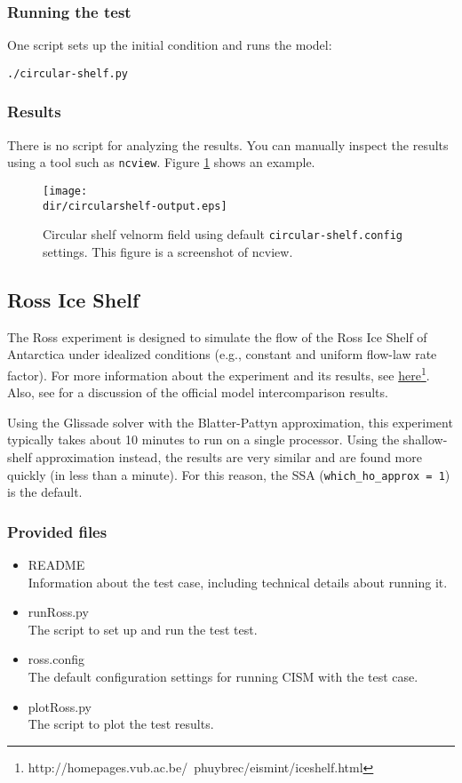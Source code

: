\subsubsection{Running the test}
One script sets up the initial condition and runs the model:

\texttt{./circular-shelf.py}

\subsubsection{Results}
There is no  script for analyzing the results.
You can manually inspect the results using a tool such as \texttt{ncview}.
Figure \ref{fig:circularshelf-results} shows an example.

\begin{figure}[H!]
	\centering
	\texttt{[image: \\dir/circularshelf-output.eps]}
	\caption{Circular shelf velnorm field using default \texttt{circular-shelf.config} settings. This figure is a screenshot of ncview.}
	\label{fig:circularshelf-results}
\end{figure}
\FloatBarrier

\subsection{Ross Ice Shelf}
The Ross experiment is designed to simulate the flow of the Ross Ice Shelf of Antarctica under idealized conditions (e.g., constant and uniform
flow-law rate factor). For more information about the experiment and its results, see 
\href{http://homepages.vub.ac.be/~phuybrec/eismint/iceshelf.html}{here}\footnote{http://homepages.vub.ac.be/~phuybrec/eismint/iceshelf.html}. 
Also, see \citet{MacAyeal:1996vn} for a discussion of the official model intercomparison results.

Using the Glissade solver with the Blatter-Pattyn approximation, this experiment typically 
takes about 10 minutes to run on a single processor.  Using the shallow-shelf approximation instead,
the results are very similar and are found more quickly (in less than a minute).
For this reason, the SSA (\texttt{which\_ho\_approx = 1}) is the default.

\subsubsection{Provided files}

\begin{itemize}
	\item README \\
		Information about the test case, including technical details about running it.
	\item runRoss.py \\
		The script to set up and run the test test.
	\item ross.config \\
  The default configuration settings for running CISM with the test case.
	\item plotRoss.py \\
		The script to plot the test results.
\end{itemize}

